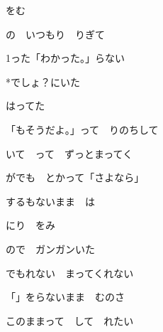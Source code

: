 \documentclass[a4paper,tate,twocolumn,12pt]{ltjtarticle}
\begin{document}
\thispagestyle{empty}

\begin{center}
{\LARGE {}をむ}
\end{center}

\vspace{1em}

\begin{flushleft}

\noindent\begin{minipage}{\linewidth}
の　いつもり　りぎて

1った「わかった。」らない

*でしょ？にいた

はってた
\end{minipage}

\vspace{2em}

\noindent\begin{minipage}{\linewidth}

「もそうだよ。」って　りのちして

いて　って　ずっとまってく

がでも　とかって「さよなら」

するもないまま　は
\end{minipage}

\vspace{2em}

\noindent\begin{minipage}{\linewidth}
にり　をみ

ので　ガンガンいた

でもれない　まってくれない

「」をらないまま　むのさ
\end{minipage}

\vspace{2em}

\noindent\begin{minipage}{\linewidth}
このままって　して　れたい


\end{minipage}
\end{flushleft}
\end{document}
